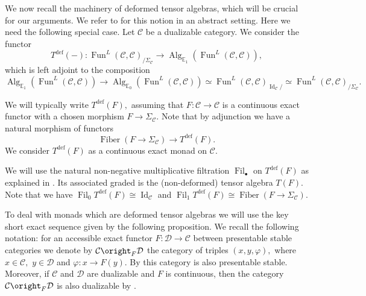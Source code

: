 \documentclass[11pt,leqno]{amsart}
\numberwithin{equation}{section}
\newcommand{\Fiber}{\operatorname{Fiber}}
\newcommand{\deff}{\operatorname{def}}
\newcommand{\Fil}{\operatorname{Fil}}
\newcommand{\bE}{{\mathbb E}}
\newcommand{\cD}{{\mathcal D}}
\newcommand{\cC}{{\mathcal C}}
\newcommand{\Fun}{\operatorname{Fun}}
\newcommand{\Id}{\operatorname{Id}}
\newcommand{\Alg}{\operatorname{Alg}}
\begin{document}
We now recall the machinery of deformed tensor algebras, which will be crucial for our arguments. We refer to \cite[Section 1.9]{E25c} for this notion in an abstract setting. Here we need the following special case. Let $\cC$ be a dualizable category. We consider the functor
\begin{equation*}
T^{\deff}(-):\Fun^L(\cC,\cC)_{/\Sigma_{\cC}}\to \Alg_{\bE_1}(\Fun^L(\cC,\cC)),
\end{equation*}
which is left adjoint to the composition
\begin{equation*}
\Alg_{\bE_1}(\Fun^L(\cC,\cC))\to \Alg_{\bE_0}(\Fun^L(\cC,\cC))\simeq \Fun^L(\cC,\cC)_{\Id_{\cC}/}\simeq \Fun^L(\cC,\cC)_{/\Sigma_{\cC}}.
\end{equation*}

We will typically write $T^{\deff}(F),$ assuming that $F:\cC\to\cC$ is a continuous exact functor with a chosen morphism $F\to\Sigma_{\cC}.$ Note that by adjunction we have a natural morphism of functors
\begin{equation*}
\Fiber(F\to\Sigma_{\cC})\to T^{\deff}(F).
\end{equation*} We consider $T^{\deff}(F)$ as a continuous exact monad on $\cC.$ 

We will use the natural non-negative multiplicative filtration $\Fil_{\bullet}$ on $T^{\deff}(F)$ as explained in \cite[Section 1.9]{E25c}. Its associated graded is the (non-deformed) tensor algebra $T(F).$ Note that we have $\Fil_0 T^{\deff}(F)\cong \Id_{\cC}$ and $\Fil_1 T^{\deff}(F)\cong \Fiber(F\to\Sigma_{\cC}).$ 

To deal with monads which are deformed tensor algebras we will use the key short exact sequence given by the following proposition. We recall the following notation: for an accessible exact functor $F:\cD\to\cC$ between presentable stable categories we denote by $\cC\oright_F \cD$ the category of triples $(x,y,\varphi),$ where $x\in\cC,$ $y\in\cD$ and $\varphi:x\to F(y).$ By \cite[Proposition 1.2]{E24} this category is also presentable stable. Moreover, if $\cC$ and $\cD$ are dualizable and $F$ is continuous, then the category $\cC\oright_F\cD$ is also dualizable by \cite[Proposition 1.78]{E24}.
\end{document}
